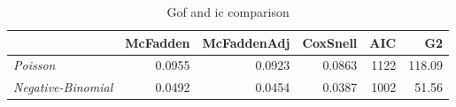 \begin{wraptable}{r}{4in}

\caption{\label{tab:gof_ic_comparison}Gof and ic comparison}
\centering
\fontsize{9}{11}\selectfont
\begin{tabular}[t]{>{}lrrrrr}
\toprule
  & McFadden & McFaddenAdj & CoxSnell & AIC & G2\\
\midrule
\em{Poisson} & 0.0955 & 0.0923 & 0.0863 & 1122 & 118.09\\
\em{Negative-Binomial} & 0.0492 & 0.0454 & 0.0387 & 1002 & 51.56\\
\bottomrule
\end{tabular}
\end{wraptable}
